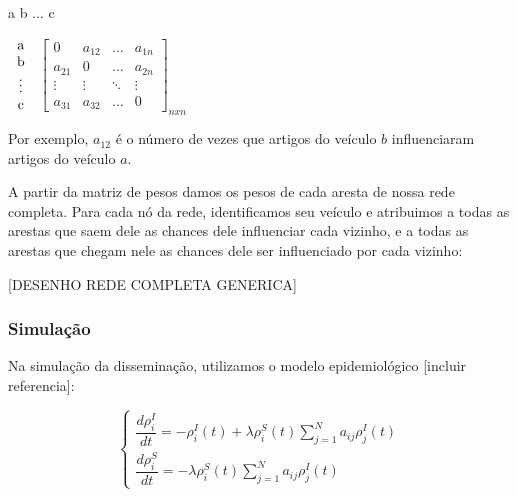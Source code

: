 \documentclass[a4paper,12pt]{article}
\begin{document}
 \begin{center}
 \hspace{0.2cm}a \hspace{0.5cm} b \hspace{0.3cm} $\hdots$ \hspace{0.4cm}c
 
 \vspace{0.2cm}
 $
 \begin{tabular}{c}
   a \\
   b \\
   \vdots\\
   c
 \end{tabular}
$
 $
 \begin{bmatrix}
  0 & a_{12} & \hdots & a_{1n}\\
  a_{21} & 0 & \hdots & a_{2n}\\
  \vdots & \vdots & \ddots & \vdots\\
  a_{31} & a_{32} & \hdots & 0
 \end{bmatrix}_{nxn}
$

\end{center}

\vspace{0.4cm}
Por exemplo, $a_{12}$ é o número de vezes que artigos do veículo $b$ influenciaram artigos do veículo $a$.

A partir da matriz de pesos damos os pesos de cada aresta de nossa rede completa. Para cada nó da rede, identificamos seu veículo e atribuimos
a todas as arestas que saem dele as chances dele influenciar cada vizinho, e a todas as arestas que chegam nele as chances dele ser influenciado
por cada vizinho:

[DESENHO REDE COMPLETA GENERICA]

\subsubsection{Simulação}

 Na simulação da disseminação, utilizamos o modelo epidemiológico [incluir referencia]:

 \begin{equation}
  \begin{cases}

   \dfrac{d\rho^{I}_{i}}{dt} = -\rho^{I}_{i}(t) + \lambda\rho_{i}^{S}(t) \sum_{j=1}^{N} a_{ij}\rho_{j}^{I}(t) \\     
   \dfrac{d\rho^{S}_{i}}{dt} = - \lambda\rho_{i}^{S}(t) \sum_{j=1}^{N} a_{ij}\rho_{j}^{I}(t)
   
  \end{cases}
 \end{equation}
\end{document}

